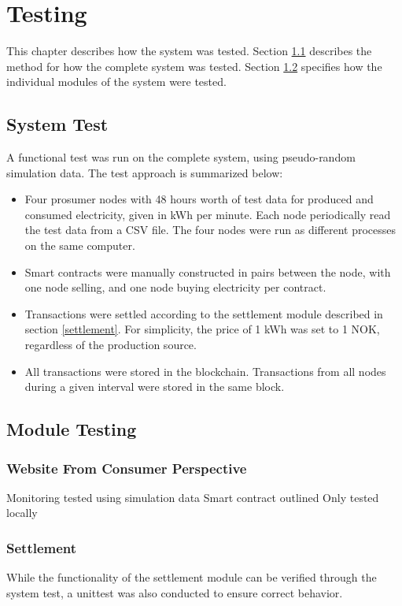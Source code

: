 \chapter{Testing}
This chapter describes how the system was tested. Section \ref{system} describes the method for how the complete system was tested. Section \ref{moduletest} specifies how the individual modules of the system were tested.


\section{System Test} \label{system}
A functional test was run on the complete system, using pseudo-random simulation data. The test approach is summarized below:
\begin{itemize}
\item Four prosumer nodes with 48 hours worth of test data for produced and consumed electricity, given in kWh per minute. Each node periodically read the test data from a CSV file. The four nodes were run as different processes on the same computer. 
\item Smart contracts were manually constructed in pairs between the node, with one node selling, and one node buying electricity per contract.
\item Transactions were settled according to the settlement module described in section \ref{settlement}. For simplicity, the price of 1 kWh was set to 1 NOK, regardless of the production source.
\item All transactions were stored in the blockchain. Transactions from all nodes during a given interval were stored in the same block. 
\end{itemize}

\section{Module Testing} \label{moduletest}
\subsection{Website From Consumer Perspective}
Monitoring tested using simulation data
Smart contract outlined
Only tested locally

\subsection{Settlement}
While the functionality of the settlement module can be verified through the system test, a unittest was also conducted to ensure correct behavior. 

